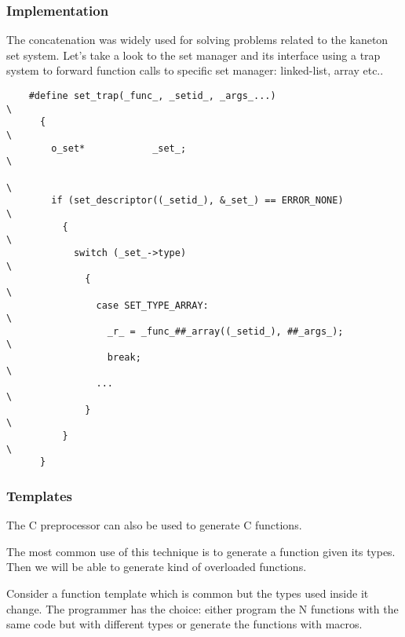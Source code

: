 \documentclass[8pt]{beamer}
\newcommand{\nl}[0]{\vspace{0.4cm}}
\begin{document}

\begin{frame}[containsverbatim]
  \frametitle{Implementation}

  The concatenation was widely used for solving problems related to
  the kaneton set system. Let's take a look to the set manager and its
  interface using a trap system to forward function calls to specific
  set manager: linked-list, array etc..

  \nl

  \begin{verbatim}
    #define set_trap(_func_, _setid_, _args_...)                            \
      {                                                                     \
        o_set*            _set_;                                            \
                                                                            \
        if (set_descriptor((_setid_), &_set_) == ERROR_NONE)                \
          {                                                                 \
            switch (_set_->type)                                            \
              {                                                             \
                case SET_TYPE_ARRAY:                                        \
                  _r_ = _func_##_array((_setid_), ##_args_);                \
                  break;                                                    \
                ...                                                         \
              }                                                             \
          }                                                                 \
      }
  \end{verbatim}
\end{frame}


\begin{frame}
  \frametitle{Templates}

  The C preprocessor can also be used to generate C functions.

  \nl

  The most common use of this technique is to generate a function given
  its types. Then we will be able to generate kind of overloaded
  functions.

  \nl

  Consider a function template which is common but the types used inside
  it change. The programmer has the choice: either program the N functions
  with the same code but with different types or generate the functions
  with macros.
\end{frame}
\end{document}
